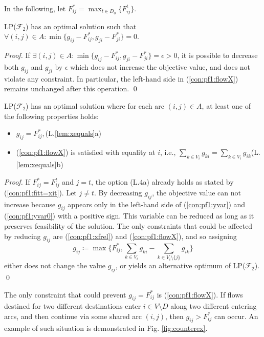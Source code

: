 In the following, let $F^*_{ij}=\max_{t\in D_0}\{F^t_{ij}\}$.
\begin{lemma}\label{lem:oneslack} LP($\mathcal{F}_2$) has an optimal solution such that \newline
$\forall (i,j)\in A: \min\{g_{ij} - F^*_{ij}, g_{ji}-F^*_{ji}\}=0$.
\end{lemma}
\begin{proof}
If $\exists (i,j)\in A: \min\{g_{ij} - F^*_{ij}, g_{ji}-F^*_{ji}\}=\epsilon>0$, it is possible to decrease both $g_{ij}$ and $g_{ji}$ by $\epsilon$ which does not increase the objective value, and does not violate any constraint.
In particular, the left-hand side in (\ref{con:pf1:flowX}) remains unchanged after this operation.
\qed
\end{proof}
\begin{lemma}\label{lem:xequals} LP($\mathcal{F}_2$) has an optimal solution where for each arc $(i,j)\in A$, at least one of the following properties holds:
\begin{itemize}
\item\label{lem:item:noslack} $g_{ij}=F^*_{ij},$\hfill(L.\ref{lem:xequals}a)
\item\label{lem:item:slack} (\ref{con:pf1:flowX}) is satisfied with equality at $i$, i.e., $\sum_{k\in V_{i}}g_{ki}=\sum_{k\in V_i}g_{ik}$\hfill(L.\ref{lem:xequals}b)
\end{itemize}
\end{lemma}
\begin{proof}
If $F^*_{ij}=F^t_{ij}$ and $j=t$, the option (L.4a) already holds as stated by (\ref{con:pf1:fitt=xit}).
Let $j\neq t$.
By decreasing $g_{ij}$, the objective value can not increase because $g_{ij}$ appears only in the left-hand side of (\ref{con:pf1:yvar}) and (\ref{con:pf1:yvar0}) with a positive sign.
This variable can be reduced as long as it preserves feasibility of the solution.
The only constraints that could be affected by reducing $g_{ij}$ are (\ref{con:pf1:xfrel}) and (\ref{con:pf1:flowX}), and so assigning 
%
$$g_{ij}\coloneqq\max\bigg\{ F^*_{ij},\sum_{k\in V_i}g_{ki}-\sum_{k\in V_i\setminus\{j\}}g_{ik}\bigg\}$$
%
either does not change the value $g_{ij}$, or yields an alternative optimum of LP($\mathcal{F}_2$). \qed
\end{proof}
The only constraint that could prevent $g_{ij}=F^*_{ij}$ is (\ref{con:pf1:flowX}).
If flows destined for two different destinations enter $i\in V\setminus D$ along two different entering arcs, and then continue via some shared arc $(i,j)$, then $g_{ij}>F^*_{ij}$ can occur.
An example of such situation is demonstrated in Fig. \ref{fig:counterex}.

